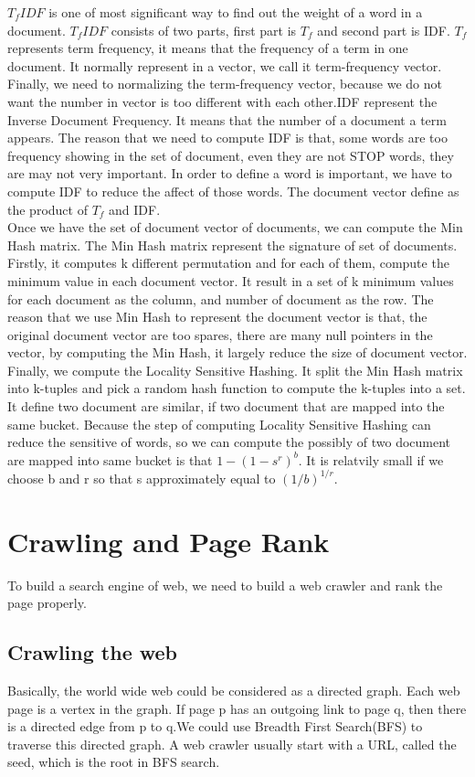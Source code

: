 \documentclass{article}
\begin{document}
$T_{f} IDF$ is one of most significant way to find out the weight of a word in a document. $T_{f} IDF$ consists of two parts, first part is $T_{f}$ and second part is IDF. $T_{f}$ represents term frequency, it means that the frequency of a term in one document. It normally represent in a vector, we call it term-frequency vector. Finally, we need to normalizing the term-frequency vector, because we do not want the number in vector is too different with each other.IDF represent the Inverse Document Frequency. It means that the number of a document a term appears. The reason that we need to compute IDF is that, some words are too frequency showing in the set of document, even they are not STOP words, they are may not very important. In order to define a word is important, we have to compute IDF to reduce the affect of those words. The document vector define as the product of $T_{f}$ and IDF.\\

Once we have the set of document vector of documents, we can compute the Min Hash matrix. The Min Hash matrix represent the signature of set of documents. Firstly, it computes k different permutation and for each of them, compute the minimum value in each document vector. It result in a set of k minimum values for each document as the column, and number of document as the row. The reason that we use Min Hash to represent the document vector is that, the original document vector are too spares, there are many null pointers in the vector, by computing the Min Hash, it largely reduce the size of document vector.\\

Finally, we compute the Locality Sensitive Hashing. It split the Min Hash matrix into k-tuples and pick a random hash function to compute the k-tuples into a set. It define two document are similar, if two document that are mapped into the same bucket. Because the step of computing Locality Sensitive Hashing can reduce the sensitive of words, so we can compute the possibly of two document are mapped into same bucket is that $1 - (1-s^{r})^{b}$. It is relatvily small if we choose b and r so that s approximately equal to $(1/b)^{1/r}$.
\section{Crawling and Page Rank}
To build a search engine of web, we need to build a web crawler and rank the page properly.
\subsection{Crawling the web}
Basically, the world wide web could be considered as a directed graph. Each web page is a vertex in the graph. If page p has an outgoing link to page q, then there is a directed edge from p to q.We could use Breadth First Search(BFS) to traverse this directed graph. A web crawler usually start with a URL, called the seed, which is the root in BFS search.\\
\end{document}
